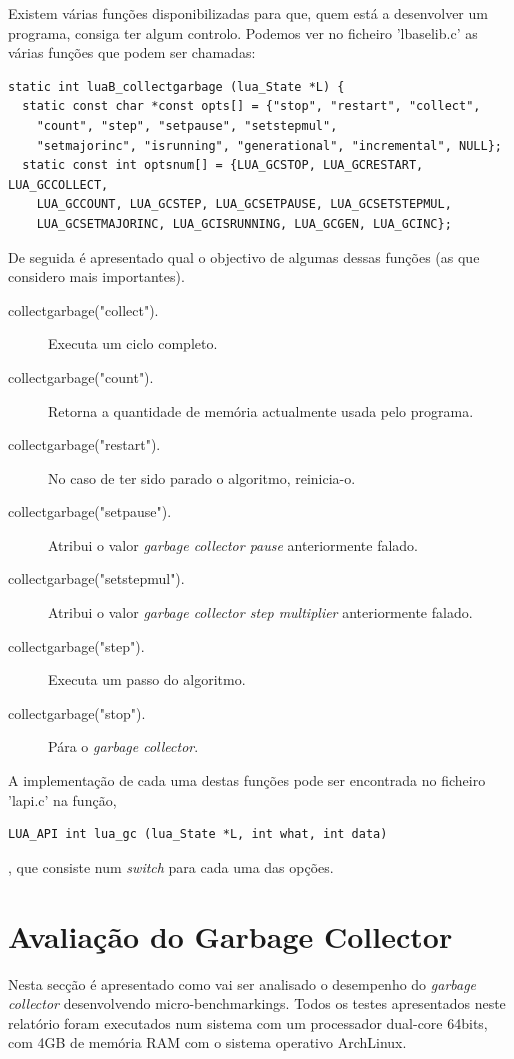 \documentclass{article}
\begin{document}
Existem várias funções disponibilizadas para que, quem está a desenvolver um programa, consiga ter algum controlo.
Podemos ver no ficheiro 'lbaselib.c' as várias funções que podem ser chamadas:
\begin{verbatim}
static int luaB_collectgarbage (lua_State *L) {
  static const char *const opts[] = {"stop", "restart", "collect",
    "count", "step", "setpause", "setstepmul",
    "setmajorinc", "isrunning", "generational", "incremental", NULL};
  static const int optsnum[] = {LUA_GCSTOP, LUA_GCRESTART, LUA_GCCOLLECT,
    LUA_GCCOUNT, LUA_GCSTEP, LUA_GCSETPAUSE, LUA_GCSETSTEPMUL,
    LUA_GCSETMAJORINC, LUA_GCISRUNNING, LUA_GCGEN, LUA_GCINC};
\end{verbatim}

De seguida é apresentado qual o objectivo de algumas dessas funções (as que considero mais importantes).
\begin{description}
\item[collectgarbage("collect").] Executa um ciclo completo.
\item[collectgarbage("count").] Retorna a quantidade de memória actualmente usada pelo programa.
\item[collectgarbage("restart").] No caso de ter sido parado o algoritmo, reinicia-o.
\item[collectgarbage("setpause").] Atribui o valor \emph{garbage collector pause} anteriormente falado.
\item[collectgarbage("setstepmul").] Atribui o valor \emph{garbage collector step multiplier} anteriormente falado.
\item[collectgarbage("step").] Executa um passo do algoritmo.
\item[collectgarbage("stop").] Pára o \emph{garbage collector}.
\end{description}

A implementação de cada uma destas funções pode ser encontrada no ficheiro 'lapi.c' na função,
\begin{verbatim}
LUA_API int lua_gc (lua_State *L, int what, int data)
\end{verbatim}
, que consiste num \emph{switch} para cada uma das opções.

%
\section{Avaliação do Garbage Collector}
\label{sec:aval}
%
Nesta secção é apresentado como vai ser analisado o desempenho do \emph{garbage collector} desenvolvendo micro-benchmarkings. Todos os testes apresentados neste relatório foram executados num sistema com um processador dual-core 64bits, com 4GB de memória RAM com o sistema operativo ArchLinux.
\end{document}
